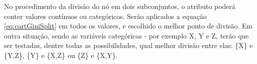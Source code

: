 
No procedimento da divisão do nó em dois subconjuntos, o atributo poderá conter valores contínuos ou categóricos. Serão aplicados a equação \ref{eq:cartGiniSplit} em todos os valores, e escolhido o melhor ponto de divisão. Em outra situação, sendo as variáveis  categóricas - por exemplo X, Y e Z, terão que ser testadas, dentre todas as possibilidades, qual melhor divisão entre elas: \{X\} e \{Y,Z\}, \{Y\} e \{X,Z\} ou \{Z\} e \{X,Y\}.

% 
% 






